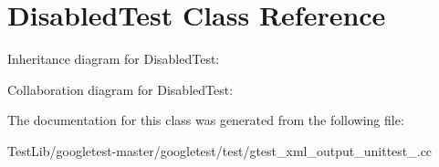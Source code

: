 \hypertarget{classDisabledTest}{}\section{Disabled\+Test Class Reference}
\label{classDisabledTest}


Inheritance diagram for Disabled\+Test\+:


Collaboration diagram for Disabled\+Test\+:


The documentation for this class was generated from the following file\+:\begin{DoxyCompactItemize}
\item 
Test\+Lib/googletest-\/master/googletest/test/gtest\+\_\+xml\+\_\+output\+\_\+unittest\+\_\+.\+cc\end{DoxyCompactItemize}
